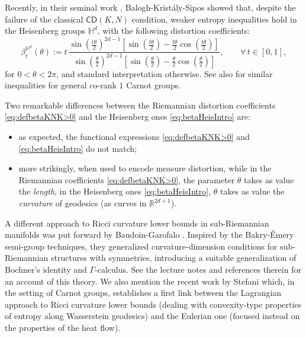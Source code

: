 \documentclass[11pt,a4paper]{article}
\theoremstyle{plain}
\theoremstyle{definition}
\theoremstyle{remark}
\numberwithin{equation}{section}
\newcommand{\R}{\mathbb{R}} %
\renewcommand{\H}{\mathbb{H}}
\newcommand{\CD}{\mathsf{CD}}
\begin{document}
Recently, in their seminal work  \cite{BKS}, Balogh-Krist\'aly-Sipos  showed that, despite the failure of the classical $\CD(K,N)$ condition,  weaker entropy inequalities hold  in the Heisenberg groups $\H^d$, with the following distortion coefficients:
\begin{equation}\label{eq:betaHeisIntro}
\beta^{\H^d}_t(\theta) :=t \, \dfrac{ \sin\left(\frac{t\theta}{2}\right)^{2d-1}\left[\sin\left(\frac{t\theta}{2}\right)-\frac{t\theta}{2} \cos\left(\frac{t\theta}{2}\right)\right]}{ \sin\left(\frac{\theta}{2}\right)^{2d-1}\left[\sin\left(\frac{\theta}{2}\right)-\frac{\theta}{2} \cos\left(\frac{\theta}{2}\right)\right]},  \qquad \forall\,t\in [0,1],
 \end{equation}
for $0<\theta<2\pi$, and standard interpretation otherwise. See also \cite{BKS2} for similar inequalities for general co-rank $1$ Carnot groups.

Two remarkable differences between the Riemannian  distortion coefficients \eqref{eq:defbetaKNK>0}  and the Heisenberg ones \eqref{eq:betaHeisIntro} are:
\begin{itemize}
\item as expected, the functional expressions  \eqref{eq:defbetaKNK>0} and \eqref{eq:betaHeisIntro} do not match;
\item more strikingly, when used to encode measure distortion, while in the Riemannian coefficients \eqref{eq:defbetaKNK>0}, the parameter $\theta$ takes as value the \emph{length}, in the Heisenberg  ones  \eqref{eq:betaHeisIntro}, $\theta$ takes as value the \emph{curvature}  of geodesics (as curves in $\R^{2d+1}$).
\end{itemize}


A different approach to Ricci curvature lower bounds in sub-Riemannian manifolds was put forward by Baudoin-Garofalo \cite{BG17}. Inspired by the Bakry-\'Emery semi-group techniques, they generalized curvature-dimension conditions  for sub-Riemannian structures with symmetries, introducing a suitable generalization of Bochner's identity and $\Gamma$-calculus. See the lecture notes \cite{BaudoinBook} and references therein for an account of this theory. We also mention the recent work by Stefani \cite{Stefani-Heat} which, in the setting of Carnot groups, establishes a first link between the Lagrangian approach to Ricci curvature lower bounds (dealing with convexity-type properties of entropy along Wasserstein geodesics) and the Eulerian one (focused instead on the properties of the heat flow).
\end{document}
